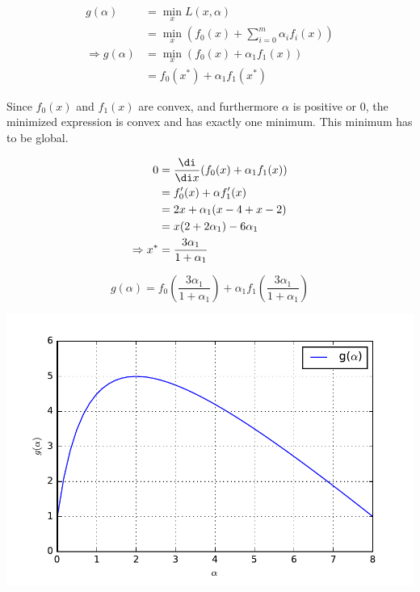 \begin{align*}
g(\alpha) &= \min\limits_x L(x,\alpha) \\
&= \min\limits_x (f_0(x) + \sum\limits_{i=0}^{m} \alpha_i f_i(x)) \\
\Rightarrow g(\alpha) &= \min\limits_x ( f_0(x) + \alpha_1 f_1(x) ) \\
&= f_0(x^*) + \alpha_1 f_1(x^*)
\end{align*}

Since $f_0(x)$ and $f_1(x)$ are convex, and furthermore $\alpha$ is positive or 0, the minimized expression is convex and has exactly one minimum. This minimum has to be global.

\begin{align*}
0 &= \frac{\di}{\di x} ( f_0(x) + \alpha_1 f_1(x) ) \\
  &= f_0'(x) + \alpha f_1'(x) \\
  &= 2x + \alpha_1 ( x-4 + x-2 ) \\
  &= x (2+2 \alpha_1) - 6 \alpha_1 \\
  \Rightarrow x^* &= \frac{3 \alpha_1}{1+\alpha_1}
\end{align*}

\[ g(\alpha) = f_0(\frac{3 \alpha_1}{1+\alpha_1}) + \alpha_1 f_1(\frac{3 \alpha_1}{1+\alpha_1}) \]

\includegraphics[scale=0.7]{problems/code/prob7_fig.pdf}


